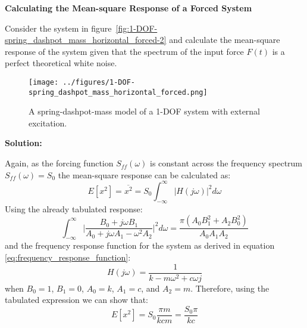 \documentclass[12pt,letter]{article}
\begin{document}
\begin{example}

	\textbf{Calculating the Mean-square Response of a Forced System}

	\noindent Consider the system in figure~\ref{fig:1-DOF-spring_dashpot_mass_horizontal_forced-2} and calculate the mean-square response of the system given that the spectrum of the input force $F(t)$ is a perfect theoretical white noise.
	\begin{figure}[H]
		\centering
		\texttt{[image: ../figures/1-DOF-spring\_dashpot\_mass\_horizontal\_forced.png]}
		\caption{A spring-dashpot-mass model of a 1-DOF system with external excitation.}
				\label{fig:1-DOF-spring_dashpot_mass_horizontal_forced-3}
	\end{figure}


	\noindent\textbf{Solution:}

	\noindent Again, as the forcing function $S_{ff}(\omega)$ is constant across the frequency spectrum $S_{ff}(\omega)=S_0$ the mean-square response can be calculated as:
	\begin{equation}
		E[x^2] = \overline{x^2} =   S_{0} \int_{-\infty}^{\infty} |H(j\omega)|^2 d\omega
	\end{equation}
	Using the already tabulated response:
	\begin{equation}
		\int_{-\infty}^{\infty} \bigg|\frac{B_0 + j \omega B_1}{A_0+j \omega A_1 - \omega^2 A_2} \bigg|^2 d\omega = \frac{\pi (A_0 B_1^2 + A_2 B_0^2)}{A_0 A_1 A_2}
	\end{equation} 
	and the frequency response function for the system as derived in equation \ref{eq:frequency_response_function}:
	\begin{equation}
		H(j\omega) = \frac{1}{k-m\omega^2+c\omega j}
	\end{equation}
	when $B_0=1$, $B_1 = 0$, $A_0=k$, $A_1=c$, and $A_2 =m$. Therefore, using the tabulated expression we can show that:
	\begin{equation}
		E[x^2] = S_0 \frac{\pi m }{k c m} =  \frac{S_0 \pi}{k c}
	\end{equation} 
\end{example}			
			
			
			

\end{document}
